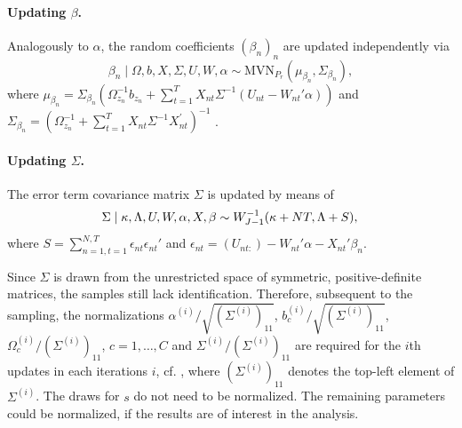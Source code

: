 \documentclass[article]{jss}
\begin{document}
\paragraph{Updating $\beta$.} Analogously to $\alpha$, the random coefficients $(\beta_n)_n$ are updated independently via
\begin{equation}
\beta_n \mid \Omega,b,X,\Sigma,U,W,\alpha \sim \text{MVN}_{P_r}(\mu_{\beta_n},\Sigma_{\beta_n}),
\end{equation}
where $\mu_{\beta_n} = \Sigma_{\beta_n} (\Omega_{z_n}^{-1}b_{z_n} + \sum_{t=1}^{T} X_{nt} \Sigma^{-1} (U_{nt}-W_{nt}'\alpha) )$ and $\Sigma_{\beta_n} = (\Omega_{z_n}^{-1} + \sum_{t=1}^{T} X_{nt}\Sigma^{-1} X_{nt}^{'} )^{-1}$ .

\paragraph{Updating $\Sigma$.}
The error term covariance matrix $\Sigma$ is updated by means of
\begin{equation}
\Sigma \mid \kappa,\Lambda,U,W,\alpha,X,\beta \sim W^{-1}_{J-1}(\kappa+NT,\Lambda+S), \\
\end{equation}
where $S = \sum_{n=1,t=1}^{N,T} \epsilon_{nt} \epsilon_{nt}'$ and $\epsilon_{nt} = (U_{nt:}) - W_{nt}'\alpha - X_{nt}'\beta_n$.

\vspace{0.5cm}
Since $\Sigma$ is drawn from the unrestricted space of symmetric, positive-definite matrices, the samples still lack identification. Therefore, subsequent to the sampling, the normalizations $\alpha^{(i)}/\sqrt{(\Sigma^{(i)})_{11}}$, $b_c^{(i)}/\sqrt{(\Sigma^{(i)})_{11}}$, $\Omega_c^{(i)}/(\Sigma^{(i)})_{11}$, $c=1,\dots,C$ and $\Sigma^{(i)}/(\Sigma^{(i)})_{11}$ are required for the $i$th updates in each iterations $i$, cf. \cite{Imai:05}, where $(\Sigma^{(i)})_{11}$ denotes the top-left element of $\Sigma^{(i)}$. The draws for $s$ do not need to be normalized. The remaining parameters could be normalized, if the results are of interest in the analysis.
\end{document}

